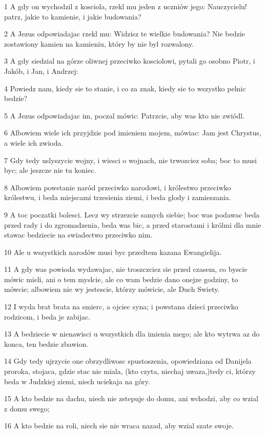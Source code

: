 \par 1 A gdy on wychodzil z kosciola, rzekl mu jeden z uczniów jego: Nauczycielu! patrz, jakie to kamienie, i jakie budowania?
\par 2 A Jezus odpowiadajac rzekl mu: Widzisz te wielkie budowania? Nie bedzie zostawiony kamien na kamieniu, który by nie byl rozwalony.
\par 3 A gdy siedzial na górze oliwnej przeciwko kosciolowi, pytali go osobno Piotr, i Jakób, i Jan, i Andrzej:
\par 4 Powiedz nam, kiedy sie to stanie, i co za znak, kiedy sie to wszystko pelnic bedzie?
\par 5 A Jezus odpowiadajac im, poczal mówic: Patrzcie, aby was kto nie zwiódl.
\par 6 Albowiem wiele ich przyjdzie pod imieniem mojem, mówiac: Jam jest Chrystus, a wiele ich zwioda.
\par 7 Gdy tedy uslyszycie wojny, i wiesci o wojnach, nie trwozciez soba; boc to musi byc; ale jeszcze nie tu koniec.
\par 8 Albowiem powstanie naród przeciwko narodowi, i królestwo przeciwko królestwu, i beda miejscami trzesienia ziemi, i beda glody i zamieszania.
\par 9 A toc poczatki bolesci. Lecz wy strzezcie samych siebie; boc was podawac beda przed rady i do zgromadzenia, beda was bic, a przed starostami i królmi dla mnie stawac bedziecie na swiadectwo przeciwko nim.
\par 10 Ale u wszystkich narodów musi byc przedtem kazana Ewangielija.
\par 11 A gdy was powioda wydawajac, nie troszczciez sie przed czasem, co byscie mówic mieli, ani o tem myslcie, ale co wam bedzie dano onejze godziny, to mówcie; albowiem nie wy jestescie, którzy mówicie, ale Duch Swiety.
\par 12 I wyda brat brata na smierc, a ojciec syna; i powstana dzieci przeciwko rodzicom, i beda je zabijac.
\par 13 A bedziecie w nienawisci u wszystkich dla imienia mego; ale kto wytrwa az do konca, ten bedzie zbawion.
\par 14 Gdy tedy ujrzycie one obrzydliwosc spustoszenia, opowiedziana od Danijela proroka, stojaca, gdzie stac nie miala, (kto czyta, niechaj uwaza,)tedy ci, którzy beda w Judzkiej ziemi, niech uciekaja na góry.
\par 15 A kto bedzie na dachu, niech nie zstepuje do domu, ani wchodzi, aby co wzial z domu swego;
\par 16 A kto bedzie na roli, niech sie nie wraca nazad, aby wzial szate swoje.
